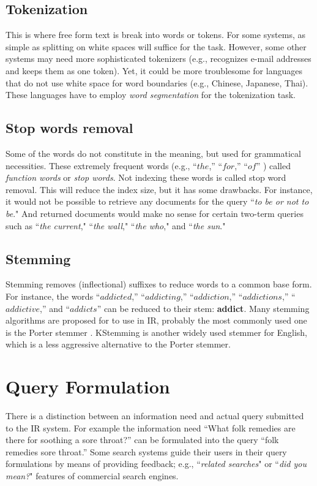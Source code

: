 \subsection{Tokenization}
This is where free form text is break into words or tokens.
For some systems, as simple as splitting on white spaces will suffice for the task.
However, some other systems may need more sophisticated tokenizers (e.g., recognizes e-mail addresses and keeps them as one token).
Yet, it could be more troublesome for languages that do not use white space for word boundaries (e.g., Chinese, Japanese, Thai).
These languages have to employ \emph{word segmentation} for the tokenization task.

\subsection{Stop words removal}
Some of the words do not constitute in the meaning, but used for grammatical necessities.
These extremely frequent words (e.g., ``$the$,'' ``$for$,'' ``$of$'' ) called \emph{function words} or \emph{stop words}.
Not indexing these words is called stop word removal.
This will reduce the index size, but it has some drawbacks.
For instance, it would not be possible to retrieve any documents for the query ``\emph{to be or not to be}."
And returned documents would make no sense for certain two-term queries such as ``\emph{the current}," ``\emph{the wall}," ``\emph{the who}," and ``\emph{the sun}."


\subsection{Stemming}
Stemming removes (inflectional) suffixes to reduce words to a common base form.
For instance, the words {``$addicted$,'' ``$addicting$,'' ``$addiction$,'' ``$addictions$,'' ``$addictive$,'' and ``$addicts$''} can be reduced to their stem: \textbf{addict}. 
Many stemming algorithms are proposed for to use in IR, probably the most commonly used one is the Porter stemmer \citep{porter}.
KStemming \citep{kstem} is another widely used stemmer for English, which is a less aggressive alternative to the Porter stemmer.

\section{Query Formulation}
There is a distinction between an information need and actual query submitted to the IR system.
For example the information need ``What folk remedies are there for soothing a sore throat?'' can be formulated into the query ``folk remedies sore throat.''
Some search systems guide their users in their query formulations by means of providing feedback; e.g., ``\emph{related searches}" or ``\emph{did you mean?}" features of commercial search engines.

